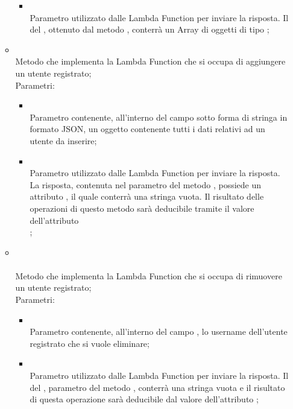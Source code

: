 \begin{itemize}
\begin{itemize}
\begin{itemize}
			\item {} \\
			Parametro utilizzato dalle Lambda Function per inviare la risposta. Il  del , ottenuto dal metodo , conterrà un Array di oggetti di tipo ;
		\end{itemize}
		\item[]  \\		Metodo che implementa la Lambda Function che si occupa di aggiungere un utente registrato;\\
		Parametri:
		\begin{itemize}
			\item {} \\
			Parametro contenente, all'interno del campo  sotto forma di stringa in formato JSON, un oggetto  contenente tutti i dati relativi ad un utente da inserire;
			\item {} \\
			Parametro utilizzato dalle Lambda Function per inviare la risposta. La risposta, contenuta nel  parametro del metodo , possiede un attributo , il quale conterrà una stringa vuota. Il risultato delle operazioni di questo metodo sarà deducibile tramite il valore dell'attributo \\ ;
		\end{itemize}
		\item[] \\ \\		Metodo che implementa la Lambda Function che si occupa di rimuovere un utente registrato;\\
		Parametri:
		\begin{itemize}
			\item {} \\
			Parametro contenente, all'interno del campo , lo username dell'utente registrato che si vuole eliminare;
			\item {} \\
			Parametro utilizzato dalle Lambda Function per inviare la risposta. Il  del , parametro del metodo , conterrà una stringa vuota e il risultato di questa operazione sarà deducibile dal valore dell'attributo ;

\end{itemize}
\end{itemize}
\end{itemize}
